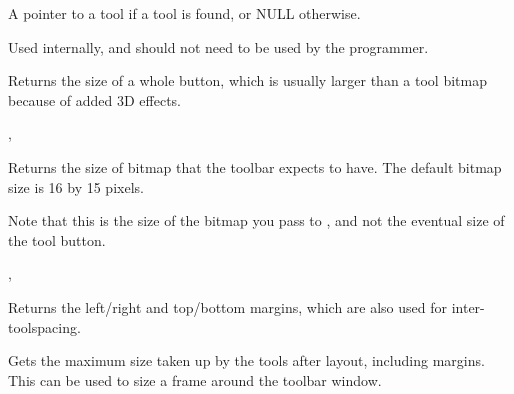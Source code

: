 A pointer to a tool if a tool is found, or NULL otherwise.


Used internally, and should not need to be used by the programmer.

\label{wxtoolbargettoolsize}


Returns the size of a whole button, which is usually larger than a tool bitmap because
of added 3D effects.


,\rtfsp
{}

\label{wxtoolbargettoolbitmapsize}


Returns the size of bitmap that the toolbar expects to have. The default bitmap size is 16 by 15 pixels.


Note that this is the size of the bitmap you pass to ,
and not the eventual size of the tool button.


,\rtfsp
{}

\label{wxtoolbargetmargins}


Returns the left/right and top/bottom margins, which are also used for inter-toolspacing.



\label{wxtoolbargetmaxsize}


Gets the maximum size taken up by the tools after layout, including margins.
This can be used to size a frame around the toolbar window.


